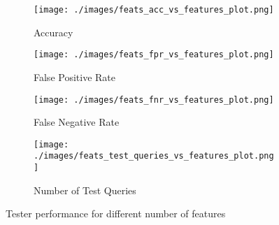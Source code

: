 \begin{figure}[!ht]
     \centering
     \begin{subfigure}[!ht]{0.4\textwidth}
         \centering
         \texttt{[image: ./images/feats\_acc\_vs\_features\_plot.png]}
         \caption{Accuracy}
         \label{fig:feats_acc_vs_features_plot_appendix}
     \end{subfigure}
    \hspace{5mm}
     \begin{subfigure}[!ht]{0.4\textwidth}
         \centering
         \texttt{[image: ./images/feats\_fpr\_vs\_features\_plot.png]}
         \caption{False Positive Rate}
         \label{fig:feats_fpr_vs_features_plot}
     \end{subfigure}
     \hspace{5mm}
     \begin{subfigure}[!ht]{0.4\textwidth}
         \centering
         \texttt{[image: ./images/feats\_fnr\_vs\_features\_plot.png]}
         \caption{False Negative Rate}
         \label{fig:feats_fnr_vs_features_plot}
     \end{subfigure}
     \hspace{5mm}
    \begin{subfigure}[!ht]{0.4\textwidth}
         \centering
         \texttt{[image: ./images/feats\_test\_queries\_vs\_features\_plot.png]}
         \caption{Number of Test Queries}
         \label{fig:feats_test_queries_vs_features_plot_appendix}
     \end{subfigure}
    \caption{Tester performance for different number of features}
    \label{fig:tester_perf_diff_feats_appendix}
\end{figure}

